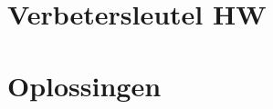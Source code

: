 \documentclass[fleqn,a4paper,11pt,twoside]{article}
\newcommand{\jaartal}{2019}
\newcommand{\groep}{HW}
\begin{document}
\section*{Verbetersleutel \groep}
\begin{multicols}{2}

\end{multicols}
\newpage
\section*{Oplossingen}

\end{document}
